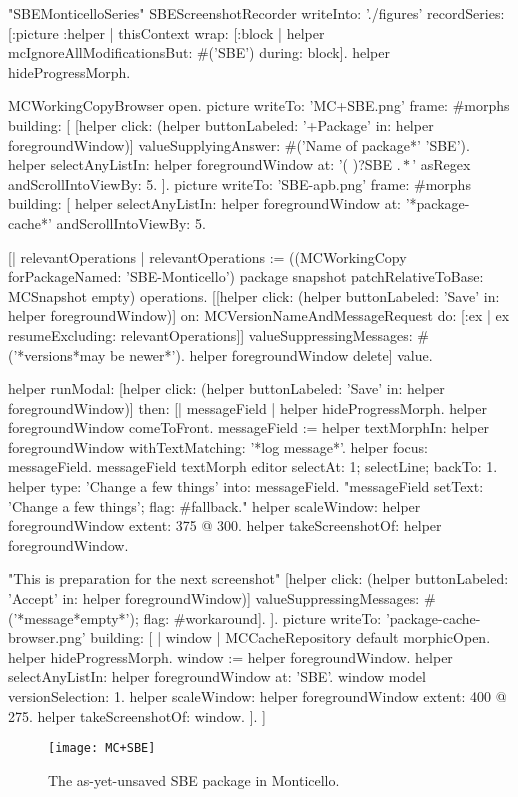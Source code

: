 \documentclass[a4paper,10pt,twoside]{book}
\begin{document}
\begin{ExecuteSmalltalkScript}
"SBEMonticelloSeries"
SBEScreenshotRecorder writeInto: './figures' recordSeries: [:picture :helper |
	thisContext wrap: [:block | helper mcIgnoreAllModificationsBut: #('SBE') during: block].
	helper hideProgressMorph.
	
	MCWorkingCopyBrowser open.
	picture writeTo: 'MC+SBE.png' frame: #morphs building: [
		[helper click: (helper buttonLabeled: '+Package' in: helper foregroundWindow)]
			valueSupplyingAnswer: #('Name of package*' 'SBE').
		helper selectAnyListIn: helper foregroundWindow at: '(\* )?SBE \(.*\)' asRegex andScrollIntoViewBy: 5.
	].
	picture writeTo: 'SBE-apb.png' frame: #morphs building: [
		helper selectAnyListIn: helper foregroundWindow at: '*package-cache*' andScrollIntoViewBy: 5.
		
		[| relevantOperations |
		relevantOperations := ((MCWorkingCopy forPackageNamed: 'SBE-Monticello') package snapshot
			patchRelativeToBase: MCSnapshot empty) operations.
		[[helper click: (helper buttonLabeled: 'Save' in: helper foregroundWindow)]
			on: MCVersionNameAndMessageRequest
			do: [:ex | ex resumeExcluding: relevantOperations]]
				valueSuppressingMessages: #('*versions*may be newer*').
		helper foregroundWindow delete] value.
		
		helper
			runModal: [helper click: (helper buttonLabeled: 'Save' in: helper foregroundWindow)]
			then: [| messageField |
				helper hideProgressMorph.
				helper foregroundWindow comeToFront.
				messageField := helper textMorphIn: helper foregroundWindow withTextMatching: '*log message*'.
				helper focus: messageField.
				messageField textMorph editor selectAt: 1; selectLine; backTo: 1.
				helper type: 'Change a few things' into: messageField.
				"messageField setText: 'Change a few things'; flag: #fallback."
				helper scaleWindow: helper foregroundWindow extent: 375 @ 300.
				helper takeScreenshotOf: helper foregroundWindow.
				
				"This is preparation for the next screenshot"
				[helper click: (helper buttonLabeled: 'Accept' in: helper foregroundWindow)]
					valueSuppressingMessages: #('*message*empty*');
					flag: #workaround].
	].
	picture writeTo: 'package-cache-browser.png' building: [
		| window |
		MCCacheRepository default morphicOpen.
		helper hideProgressMorph.
		window := helper foregroundWindow.
		helper selectAnyListIn: helper foregroundWindow at: 'SBE'.
		window model versionSelection: 1.
		helper scaleWindow: helper foregroundWindow extent: 400 @ 275.
		helper takeScreenshotOf: window.
	].
]
\end{ExecuteSmalltalkScript}
\begin{figure}[tbp]
	\begin{center}
		\texttt{[image: MC+SBE]}
	\end{center}
	\caption{The as-yet-unsaved SBE package in Monticello.}
	\label{fig:MC+SBE}
\end{figure}
\end{document}

